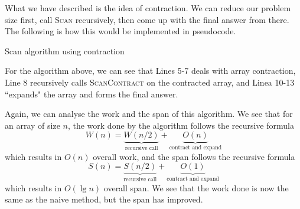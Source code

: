 \documentclass[12pt]{article}
\begin{document}
\begin{center}
\end{center}

What we have described is the idea of contraction. We can reduce our problem size first, call \textsc{Scan} recursively, then come up with the final answer from there. The following is how this would be implemented in pseudocode.
\begin{algorithm}[H]
	\caption{Scan algorithm using contraction}
	\label{scco}
	\begin{algorithmic}[1]
		 
		\EndParFor
		 
		\EndParFor
		\State {}
		\EndFunction
	\end{algorithmic}
\end{algorithm}
For the algorithm above, we can see that Lines 5-7 deals with array contraction, Line 8 recursively calls \textsc{ScanContract} on the contracted array, and Linea 10-13 ``expands" the array and forms the final answer.

Again, we can analyse the work and the span of this algorithm. We see that for an array of size $n$, the work done by the algorithm follows the recursive formula $$W(n) = \underbrace{W(n/2) }_{\text{recursive call} }+ \underbrace{O(n)}_{\text{contract and expand}}$$ which results in $O(n)$ overall work, and the span follows the recursive formula $$S(n) = \underbrace{S(n/2) }_{\text{recursive call} }+ \underbrace{O(1)}_{\text{contract and expand}}$$ which results in $O(\lg n)$ overall span. We see that the work done is now the same as the naive method, but the span has improved.
\end{document}
